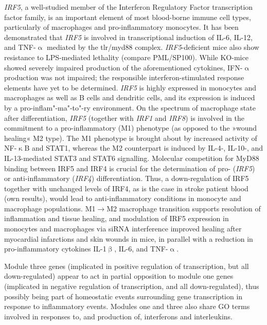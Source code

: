 \emph{IRF5}, a well-studied member of the Interferon Regulatory Factor transcription factor family, is an important element of most blood-borne immune cell types, particularly of macrophages and pro-inflammatory monocytes.\cite{Li2016} It has been demonstrated that \emph{IRF5} is involved in transcriptional induction of IL-6, IL-12, and TNF-$\upalpha$ mediated by the \acf{tlr}/\ac{myd88} complex. \emph{IRF5}-deficient mice also show resistance to LPS-mediated lethality (compare PML/SP100).\cite{Takaoka2005} While KO-mice showed severely impaired production of the aforementioned cytokines, IFN-$\upalpha$ production was not impaired; the responsible interferon-stimulated response elements have yet to be determined.\cite{Takaoka2005} \emph{IRF5} is highly expressed in monocytes and macrophages as well as B cells and dendritic cells, and its expression is induced by a pro-inflam"-ma"-to"-ry environment.\cite{Krausgruber2011} On the spectrum of macrophage state after differentiation, \emph{IRF5} (together with \emph{IRF1} and \emph{IRF8}) is involved in the commitment to a pro-inflammatory (M1) phenotype (as opposed to the »wound healing« M2 type).\cite{Chistiakov2018}  The M1 phenotype is brought about by increased activity of NF-$\upkappa$B and STAT1, whereas the M2 counterpart is induced by IL-4-, IL-10-, and IL-13-mediated STAT3 and STAT6 signalling.\cite{Wang2014a} Molecular competition for MyD88 binding between IRF5 and IRF4 is crucial for the determination of pro- (\emph{IRF5}) or anti-inflammatory (\emph{IRF4}) differentiation.\cite{Negishi2006} Thus, a down-regulation of IRF5 together with unchanged levels of IRF4, as is the case in stroke patient blood (own results), would lead to anti-inflammatory conditions in monocyte and macrophage populations. M1$\to$M2 macrophage transition supports resolution of inflammation and tissue healing, and modulation of IRF5 expression in monocytes and macrophages via siRNA interference improved healing after myocardial infarctions and skin wounds in mice, in parallel with a reduction in pro-inflammatory cytokines IL-1$\upbeta$, IL-6, and TNF-$\upalpha$.\cite{Courties2014}

Module three genes (implicated in positive regulation of transcription, but all down-regulated) appear to act in partial opposition to module one genes (implicated in negative regulation of transcription, and all down-regulated), thus possibly being part of homeostatic events surrounding gene transcription in response to inflammatory events. Modules one and three also share GO terms involved in responses to, and production of, interferons and interleukins.

